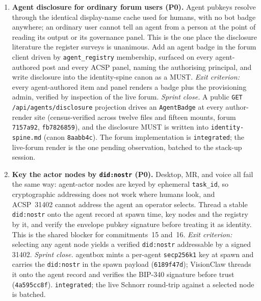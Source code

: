 \begin{enumerate}[start=13]
  \item \textbf{Agent disclosure for ordinary forum users (P0).} Agent pubkeys resolve through the identical display-name cache used for humans, with no bot badge anywhere; an ordinary user cannot tell an agent from a person at the point of reading its output or its governance panel. This is the one place the disclosure literature the register surveys is unanimous. Add an agent badge in the forum client driven by \texttt{agent\_registry} membership, surfaced on every agent-authored post and every ACSP panel, naming the authorising principal, and write disclosure into the identity-spine canon as a MUST. \emph{Exit criterion:} every agent-authored item and panel renders a badge plus the provisioning admin, verified by inspection of the live forum. \emph{Sprint close.} A public \texttt{GET /api/agents/disclosure} projection drives an \texttt{AgentBadge} at every author-render site (census-verified across twelve files and fifteen mounts, forum \texttt{7157a92}, \texttt{fb7826859}), and the disclosure MUST is written into \texttt{identity-spine.md} (canon \texttt{8aabb4c}). The forum implementation is \texttt{integrated}; the live-forum render is the one pending observation, batched to the stack-up session.

  \item \textbf{Key the actor nodes by \texttt{did:nostr} (P0).} Desktop, MR, and voice all fail the same way: agent-actor nodes are keyed by ephemeral \texttt{task\_id}, so cryptographic addressing does not work where humans look, and ACSP~31402 cannot address the agent an operator selects. Thread a stable \texttt{did:nostr} onto the agent record at spawn time, key nodes and the registry by it, and verify the envelope pubkey signature before treating it as identity. This is the shared blocker for commitments~15 and~16. \emph{Exit criterion:} selecting any agent node yields a verified \texttt{did:nostr} addressable by a signed 31402. \emph{Sprint close.} agentbox mints a per-agent \texttt{secp256k1} key at spawn and carries the \texttt{did:nostr} in the spawn payload (\texttt{6189f47d}); VisionClaw threads it onto the agent record and verifies the BIP-340 signature before trust (\texttt{4a595cc8f}). \texttt{integrated}; the live Schnorr round-trip against a selected node is batched.


\end{enumerate}
